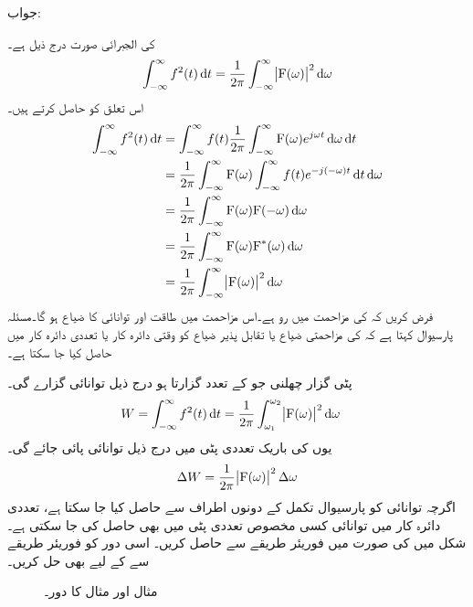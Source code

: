 جواب:

 کی الجبرائی صورت درج ذیل ہے۔
\begin{align}
\int_{-\infty}^{\infty} f^2(t) \dif t=\frac{1}{2\pi}\int_{-\infty}^{\infty} \abs{\bF(\omega)}^2\dif \omega
\end{align}
اس تعلق کو حاصل کرتے ہیں۔
\begin{align*}
\int_{-\infty}^{\infty} f^2(t) \dif t&=\int_{-\infty}^{\infty} f(t) \frac{1}{2\pi} \int_{-\infty}^{\infty} \bF(\omega) e^{j\omega t} \dif \omega \dif t\\
&= \frac{1}{2\pi} \int_{-\infty}^{\infty}\bF(\omega)\int_{-\infty}^{\infty}  f(t) e^{-j(-\omega) t} \dif t \dif \omega \\
&= \frac{1}{2\pi} \int_{-\infty}^{\infty}\bF(\omega)\bF(-\omega) \dif \omega \\
&=\frac{1}{2\pi}  \int_{-\infty}^{\infty} \bF(\omega)\bF^*(\omega) \dif \omega \\
&=\frac{1}{2\pi}  \int_{-\infty}^{\infty} \abs{\bF(\omega)}^2\dif \omega 
\end{align*}
فرض کریں کہ  کی مزاحمت میں رو  ہے۔اس مزاحمت میں طاقت  اور توانائی کا ضیاع  ہو گا۔مسئلہ پارسیوال کہتا ہے کہ  کی مزاحمتی ضیاع یا تقابل پذیر ضیاع کو وقتی دائرہ کار یا تعددی دائرہ کار میں حاصل کیا جا سکتا ہے۔ 

پٹی گزار چھلنی جو  کے تعدد گزارتا ہو درج ذیل توانائی گزارے گی۔
\begin{align}
W=\int_{-\infty}^{\infty} f^2(t) \dif t&=\frac{1}{2\pi}  \int_{\omega_1}^{\omega_2} \abs{\bF(\omega)}^2\dif \omega 
\end{align}
یوں  کی باریک تعددی پٹی میں درج ذیل توانائی پائی جائے گی۔
\begin{align}
\Delta W=\frac{1}{2\pi} \abs{{{\textup{F}}}(\omega)}^2 \Delta \omega
\end{align}
اگرچہ توانائی کو پارسیوال تکمل کے دونوں اطراف سے حاصل کیا جا سکتا ہے، تعددی دائرہ کار میں توانائی کسی مخصوص تعددی پٹی میں بھی حاصل کی جا سکتی ہے۔
شکل  میں  کی صورت میں  فوریئر طریقے سے حاصل کریں۔ اسی دور کو فوریئر طریقے سے  کے لیے بھی حل کریں۔ 
\begin{figure}
\centering
{}
\caption{مثال  اور مثال  کا دور۔}
\label{شکل_فوریئر_مزاحمت_امالہ}
\end{figure}

